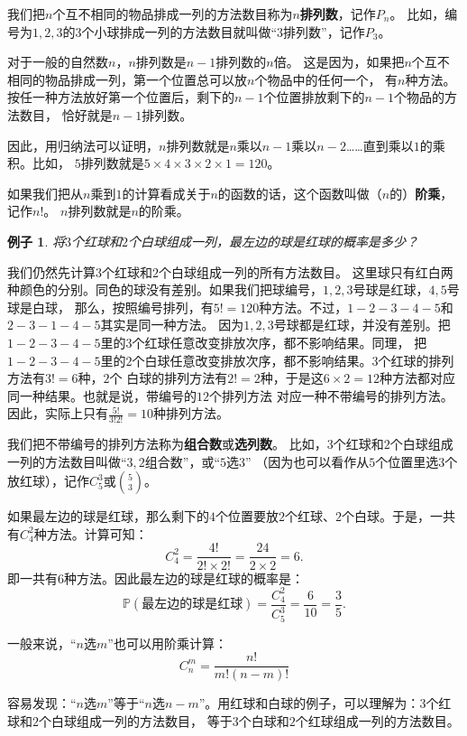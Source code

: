 \documentclass[12pt,UTF8]{ctexbook}
\newtheorem{ex}{例子}[section]
\begin{document}
我们把$n$个互不相同的物品排成一列的方法数目称为$n$\textbf{排列数}，记作$P_n$。
比如，编号为$1,2,3$的$3$个小球排成一列的方法数目就叫做“$3$排列数”，记作$P_3$。

对于一般的自然数$n$，$n$排列数是$n-1$排列数的$n$倍。
这是因为，如果把$n$个互不相同的物品排成一列，第一个位置总可以放$n$个物品中的任何一个，
有$n$种方法。按任一种方法放好第一个位置后，剩下的$n-1$个位置排放剩下的$n-1$个物品的方法数目，
恰好就是$n-1$排列数。

因此，用归纳法可以证明，$n$排列数就是$n$乘以$n-1$乘以$n-2$……直到乘以$1$的乘积。比如，
$5$排列数就是$5\times 4\times 3\times 2\times 1 = 120$。

如果我们把从$n$乘到$1$的计算看成关于$n$的函数的话，这个函数叫做（$n$的）\textbf{阶乘}，记作$n!$。
$n$排列数就是$n$的阶乘。

\begin{ex}
    将$3$个红球和$2$个白球组成一列，最左边的球是红球的概率是多少？
\end{ex}
我们仍然先计算$3$个红球和$2$个白球组成一列的所有方法数目。
这里球只有红白两种颜色的分别。同色的球没有差别。如果我们把球编号，$1,2,3$号球是红球，$4,5$号球是白球，
那么，按照编号排列，有$5! = 120$种方法。不过，$1-2-3-4-5$和$2-3-1-4-5$其实是同一种方法。
因为$1,2,3$号球都是红球，并没有差别。把$1-2-3-4-5$里的$3$个红球任意改变排放次序，都不影响结果。同理，
把$1-2-3-4-5$里的$2$个白球任意改变排放次序，都不影响结果。$3$个红球的排列方法有$3! = 6$种，$2$个
白球的排列方法有$2! = 2$种，于是这$6\times 2 = 12$种方法都对应同一种结果。也就是说，带编号的$12$个排列方法
对应一种不带编号的排列方法。因此，实际上只有$\frac{5!}{3!2!} = 10$种排列方法。

我们把不带编号的排列方法称为\textbf{组合数}或\textbf{选列数}。
比如，$3$个红球和$2$个白球组成一列的方法数目叫做“$3,2$组合数”，或“$5$选$3$”
（因为也可以看作从$5$个位置里选$3$个放红球），记作$C_5^3$或$5 \choose 3$。

如果最左边的球是红球，那么剩下的$4$个位置要放$2$个红球、$2$个白球。于是，一共有$C_4^2$种方法。计算可知：
$$ C_4^2 = \frac{4!}{2!\times 2!} = \frac{24}{2\times 2} = 6.$$
即一共有$6$种方法。因此最左边的球是红球的概率是：
$$ \mathbb{P}(\mbox{最左边的球是红球}) = \frac{C_4^2}{C_5^3} = \frac{6}{10} = \frac{3}{5}.$$

一般来说，“$n$选$m$”也可以用阶乘计算：
$$ C_n^m = \frac{n!}{m!(n-m)!} $$

容易发现：“$n$选$m$”等于“$n$选$n-m$”。用红球和白球的例子，可以理解为：$3$个红球和$2$个白球组成一列的方法数目，
等于$3$个白球和$2$个红球组成一列的方法数目。
\end{document}
